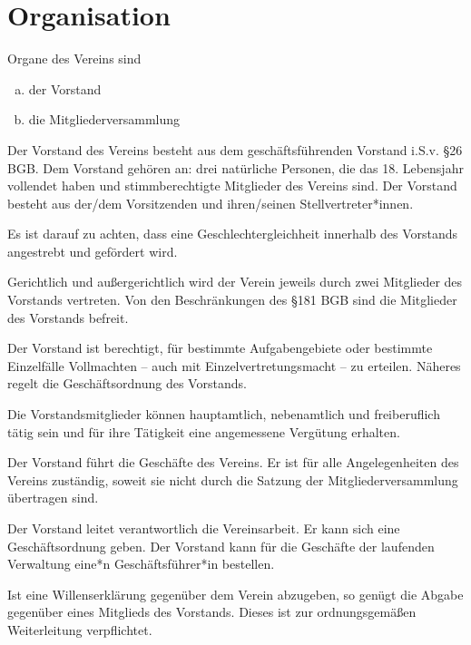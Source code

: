 \section{Organisation}
\begin{contract}

    Organe des Vereins sind
    \begin{enumerate}[(a)]
        \item der Vorstand
        \item die Mitgliederversammlung
    \end{enumerate}

    Der Vorstand des Vereins besteht aus dem geschäftsführenden Vorstand i.S.v. \S 26 BGB. Dem Vorstand gehören an: drei natürliche Personen, die das 18. Lebensjahr vollendet haben und stimmberechtigte Mitglieder des Vereins sind. Der Vorstand besteht aus der/dem Vorsitzenden und ihren/seinen Stellvertreter*innen.

    Es ist darauf zu achten, dass eine Geschlechtergleichheit innerhalb des Vorstands angestrebt und gefördert wird.

    Gerichtlich und außergerichtlich wird der Verein jeweils durch zwei Mitglieder des Vorstands vertreten. Von den Beschränkungen des \S 181 BGB sind die Mitglieder des Vorstands befreit.

    Der Vorstand ist berechtigt, für bestimmte Aufgabengebiete oder bestimmte Einzelfälle Vollmachten – auch mit Einzelvertretungsmacht – zu erteilen. Näheres regelt die Geschäftsordnung des Vorstands.

    Die Vorstandsmitglieder können hauptamtlich, nebenamtlich und freiberuflich tätig sein und für ihre Tätigkeit eine angemessene Vergütung erhalten.

    Der Vorstand führt die Geschäfte des Vereins. Er ist für alle Angelegenheiten des Vereins zuständig, soweit sie nicht durch die Satzung der Mitgliederversammlung übertragen sind.

    Der Vorstand leitet verantwortlich die Vereinsarbeit. Er kann sich eine Geschäftsordnung geben. Der Vorstand kann für die Geschäfte der laufenden Verwaltung eine*n Geschäftsführer*in bestellen.

    Ist eine Willenserklärung gegenüber dem Verein abzugeben, so genügt die Abgabe gegenüber eines Mitglieds des Vorstands. Dieses ist zur ordnungsgemäßen Weiterleitung verpflichtet.


\end{contract}
